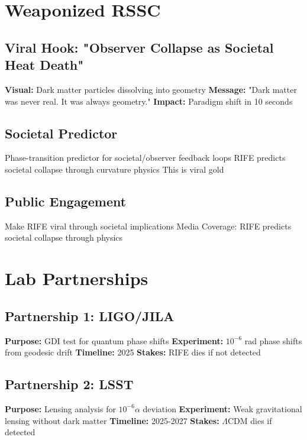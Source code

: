 \documentclass[11pt]{report}
\newcommand{\lamcdm}{$\Lambda$CDM}
\newcommand{\tenminus}{$10^{-6}$}
\newcommand{\tenminusalpha}{$10^{-6}\alpha$}
\begin{document}
\section{Weaponized RSSC}

\subsection{Viral Hook: "Observer Collapse as Societal Heat Death"}
\textbf{Visual:} Dark matter particles dissolving into geometry
\textbf{Message:} "Dark matter was never real. It was always geometry."
\textbf{Impact:} Paradigm shift in 10 seconds

\subsection{Societal Predictor}
Phase-transition predictor for societal/observer feedback loops
RIFE predicts societal collapse through curvature physics
This is viral gold

\subsection{Public Engagement}
Make RIFE viral through societal implications
Media Coverage: RIFE predicts societal collapse through physics

\section{Lab Partnerships}

\subsection{Partnership 1: LIGO/JILA}
\textbf{Purpose:} GDI test for quantum phase shifts
\textbf{Experiment:} \tenminus{} rad phase shifts from geodesic drift
\textbf{Timeline:} 2025
\textbf{Stakes:} RIFE dies if not detected

\subsection{Partnership 2: LSST}
\textbf{Purpose:} Lensing analysis for \tenminusalpha{} deviation
\textbf{Experiment:} Weak gravitational lensing without dark matter
\textbf{Timeline:} 2025-2027
\textbf{Stakes:} \lamcdm{} dies if detected
\end{document}
